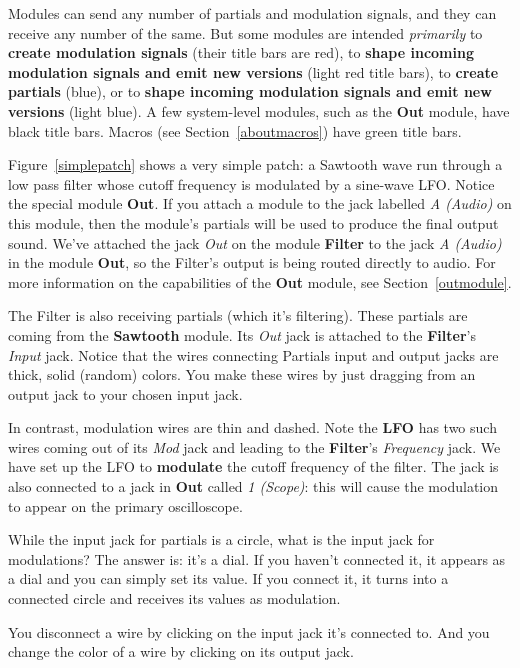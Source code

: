 \documentclass{article}
\begin{document}
Modules can send any number of partials and modulation signals, and they can receive any number of the same.  But some modules are intended {\it primarily} to {\bf create modulation signals} (their title bars are red), to {\bf shape incoming modulation signals and emit new versions} (light red title bars), to {\bf create partials} (blue), or to {\bf shape incoming modulation signals and emit new versions} (light blue).  A few system-level modules, such as the {\bf Out} module, have black title bars.  Macros (see Section~\ref{aboutmacros}) have green title bars.

Figure~\ref{simplepatch} shows a very simple patch: a Sawtooth wave run through a low pass filter whose cutoff frequency is modulated by a sine-wave LFO.   Notice the special module {\bf Out}.  If you attach a module to the jack labelled {\it A (Audio)} on this module, then the module's partials will be used to produce the final output sound.  We've attached the jack {\it Out} on the module {\bf Filter} to the jack {\it A (Audio)} in the module {\bf Out}, so the Filter's output is being routed directly to audio.   For more information on the capabilities of the {\bf Out} module, see Section~\ref{outmodule}.

The Filter is also receiving partials (which it's filtering).  These partials are coming from the {\bf Sawtooth} module.  Its {\it Out} jack is attached to the {\bf Filter}'s {\it Input} jack.  Notice that the wires connecting Partials input and output jacks are thick, solid (random) colors.  You make these wires by just dragging from an output jack to your chosen input jack.

In contrast, modulation wires are thin and dashed.  Note the {\bf LFO} has two such wires coming out of its {\it Mod} jack and leading to the {\bf Filter}'s {\it Frequency} jack.  We have set up the LFO to {\bf modulate} the cutoff frequency of the filter.
The jack is also connected to a jack in {\bf Out} called {\it 1 (Scope)}: this will cause the modulation to appear on the primary oscilloscope.  

While the input jack for partials is a circle, what is the input jack for modulations?  The answer is: it's a dial.  If you haven't connected it, it appears as a dial and you can simply set its value.  If you connect it, it turns into a connected circle and receives its values as modulation. 

You disconnect a wire by clicking on the input jack it's connected to.  And you change the color of a wire by clicking on its output jack.
\end{document}
